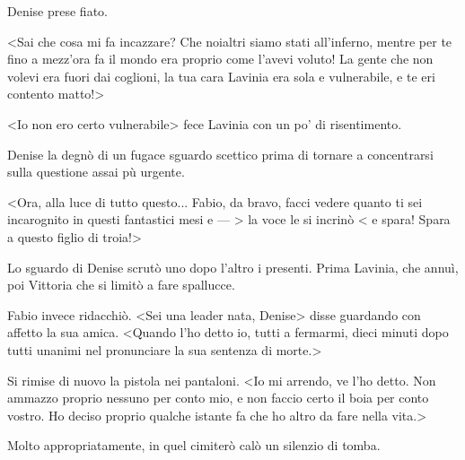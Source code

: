Denise prese fiato.

<Sai che cosa mi fa incazzare? Che noialtri siamo stati all'inferno, mentre per te fino a mezz'ora fa il mondo era proprio come l'avevi voluto! La gente che non volevi era fuori dai coglioni, la tua cara Lavinia era sola e vulnerabile, e te eri contento matto!>

<Io non ero certo vulnerabile> fece Lavinia con un po' di risentimento.

Denise la degnò di un fugace sguardo scettico prima di tornare a concentrarsi sulla questione assai pù urgente.

<Ora, alla luce di tutto questo... Fabio, da bravo, facci vedere quanto ti sei incarognito in questi fantastici mesi e --- > la voce le si incrinò < e spara! Spara a questo figlio di troia!>

Lo sguardo di Denise scrutò uno dopo l'altro i presenti. Prima Lavinia, che annuì, poi Vittoria che si limitò a fare spallucce.

Fabio invece ridacchiò. <Sei una leader nata, Denise> disse guardando con affetto la sua amica. <Quando l'ho detto io, tutti a fermarmi, dieci minuti dopo tutti unanimi nel pronunciare la sua sentenza di morte.>

Si rimise di nuovo la pistola nei pantaloni. <Io mi arrendo, ve l'ho detto. Non ammazzo proprio nessuno per conto mio, e non faccio certo il boia per conto vostro. Ho deciso proprio qualche istante fa che ho altro da fare nella vita.>

Molto appropriatamente, in quel cimiterò calò un silenzio di tomba.
